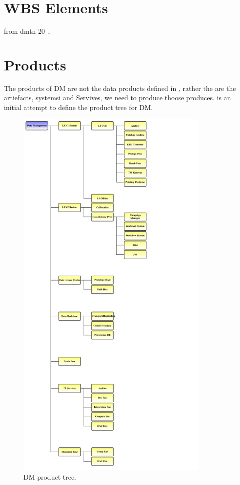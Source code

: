 \section{WBS Elements } \label{sect:WBS}

from dmtn-20 ..


\section {Products} \label{sect:products}

The products of DM are not the data products defined in , rather the are the artiefacts, systemsi and Servives,  we need to produce thoose produces.  is an initial attempt to define the product tree for DM. 

\begin{figure}[htbp]
\begin{center}
 \includegraphics[height=19cm]{productlist}
\caption{DM product tree. \label{fig:prods}}
\end{center}
\end{figure}

